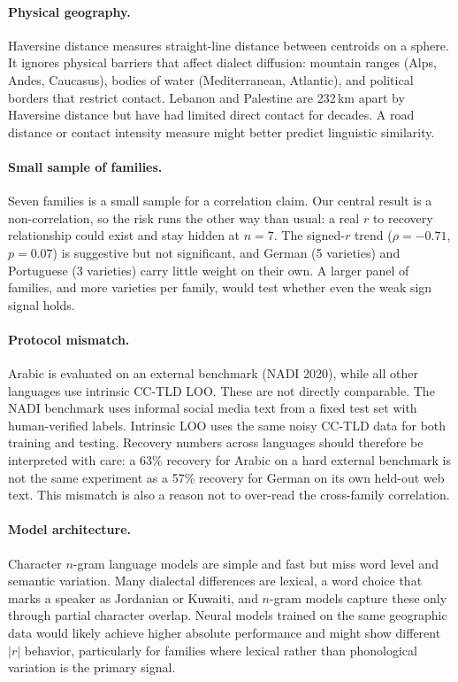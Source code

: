 \documentclass[11pt]{article}
\begin{document}
\paragraph{Physical geography.}
Haversine distance measures straight-line distance between centroids on a sphere.
It ignores physical barriers that affect dialect diffusion: mountain ranges (Alps, Andes, Caucasus), bodies of water (Mediterranean, Atlantic), and political borders that restrict contact.
Lebanon and Palestine are 232\,km apart by Haversine distance but have had limited direct contact for decades.
A road distance or contact intensity measure might better predict linguistic similarity.

\paragraph{Small sample of families.}
Seven families is a small sample for a correlation claim.
Our central result is a non-correlation, so the risk runs the other way than usual: a real $r$ to recovery relationship could exist and stay hidden at $n{=}7$.
The signed-$r$ trend ($\rho{=}{-}0.71$, $p{=}0.07$) is suggestive but not significant, and German (5 varieties) and Portuguese (3 varieties) carry little weight on their own.
A larger panel of families, and more varieties per family, would test whether even the weak sign signal holds.

\paragraph{Protocol mismatch.}
Arabic is evaluated on an external benchmark (NADI 2020), while all other languages use intrinsic CC-TLD LOO.
These are not directly comparable.
The NADI benchmark uses informal social media text from a fixed test set with human-verified labels.
Intrinsic LOO uses the same noisy CC-TLD data for both training and testing.
Recovery numbers across languages should therefore be interpreted with care: a 63\% recovery for Arabic on a hard external benchmark is not the same experiment as a 57\% recovery for German on its own held-out web text.
This mismatch is also a reason not to over-read the cross-family correlation.

\paragraph{Model architecture.}
Character $n$-gram language models are simple and fast but miss word level and semantic variation.
Many dialectal differences are lexical, a word choice that marks a speaker as Jordanian or Kuwaiti, and $n$-gram models capture these only through partial character overlap.
Neural models trained on the same geographic data would likely achieve higher absolute performance and might show different $|r|$ behavior, particularly for families where lexical rather than phonological variation is the primary signal.
\end{document}
